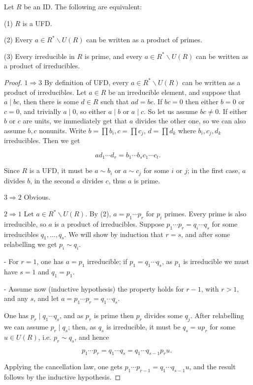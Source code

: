 \begin{proposition}
    Let $R$ be an ID. The following are equivalent:

    (1) $R$ is a UFD.
    
    (2) Every $a \in R^{*} \backslash U(R)$ can be written as a product of primes.
    
    (3) Every irreducible in $R$ is prime, and every $a \in R^{*} \backslash U(R)$ can be written as a product of irreducibles.
\end{proposition} 
\begin{proof}
$1 \Rightarrow 3$ By definition of UFD, every $a \in R^{*} \backslash U(R)$ can be written as a product of irreducibles. Let $a \in R$ be an irreducible element, and suppose that $a \mid b c$, then there is some $d \in R$ such that $a d=b c$. If $b c=0$ then either $b=0$ or $c=0$, and trivially $a \mid 0$, so either $a \mid b$ or $a \mid c$. So let us assume $b c \neq 0$. If either $b$ or $c$ are units, we immediately get that $a$ divides the other one, so we can also assume $b, c$ nonunits. Write $b=\prod b_{i}, c=\prod c_{j}$, $d=\prod d_{k}$ where $b_{i}, c_{j}, d_{k}$ irreducibles. Then we get

$$
a d_{1} \cdots d_{r}=b_{1} \cdots b_{s} c_{1} \cdots c_{t} .
$$

Since $R$ is a UFD, it must be $a \sim b_{i}$ or $a \sim c_{j}$ for some $i$ or $j$; in the first case, $a$ divides $b$, in the second $a$ divides $c$, thus $a$ is prime.

$3 \Rightarrow 2$ Obvious.

$2 \Rightarrow 1$ Let $a \in R^{*} \backslash U(R)$. By (2), $a=p_{1} \cdots p_{r}$ for $p_{i}$ primes. Every prime is also irreducible, so $a$ is a product of irreducibles. Suppose $p_{1} \cdots p_{r}=q_{i} \cdots q_{s}$ for some irreducibles $q_{1}, \ldots, q_{s}$. We will show by induction that $r=s$, and after some relabelling we get $p_{i} \sim q_{i}$.

- For $r=1$, one has $a=p_{1}$ irreducible; if $p_{1}=q_{1} \cdots q_{s}$, as $p_{1}$ is irreducible we must have $s=1$ and $q_{1}=p_{1}$.

- Assume now (inductive hypothesis) the property holds for $r-1$, with $r>1$, and any $s$, and let $a=p_{1} \cdots p_{r}=q_{1} \cdots q_{s}$.

One has $p_{r} \mid q_{1} \cdots q_{s}$, and as $p_{r}$ is prime then $p_{r}$ divides some $q_{j}$. After relabelling we can assume $p_{r} \mid q_{s}$; then, as $q_{s}$ is irreducible, it must be $q_{s}=u p_{r}$ for some $u \in U(R)$, i.e. $p_{r} \sim q_{s}$, and hence

$$
p_{1} \cdots p_{r}=q_{1} \cdots q_{s}=q_{1} \cdots q_{s-1} p_{r} u \text {. }
$$

Applying the cancellation law, one gets $p_{1} \cdots p_{r-1}=q_{1} \cdots q_{s-1} u$, and the result follows by the inductive hypothesis.    
\end{proof}

